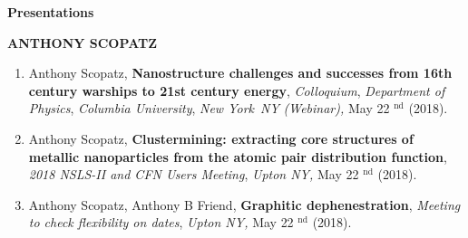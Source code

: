 \documentclass[prl,tighten,amsmath,amssymb,floatfix]{revtex4-1}
\begin{document}
\textbf{Presentations}

\textbf{ANTHONY SCOPATZ}
\vskip 12pt

\begin{enumerate}

\item Anthony Scopatz, {\bf Nanostructure challenges and successes from 16th century warships to 21st century energy},
{\it Colloquium},
{\it Department of Physics},
{\it Columbia University},
{\it New York}\
{\it NY}
{\it (Webinar)}{\it ,} { May }22%
$^\mathrm{ nd }$
(2018).

\item Anthony Scopatz, {\bf Clustermining: extracting core structures of metallic nanoparticles from the atomic pair distribution function},
{\it 2018 NSLS-II and CFN Users Meeting},
{\it Upton NY}{\it ,} { May }22%
$^\mathrm{ nd }$
(2018).

\item Anthony Scopatz, Anthony B Friend, {\bf Graphitic dephenestration},
{\it Meeting to check flexibility on dates},
{\it Upton NY}{\it ,} { May }22%
$^\mathrm{ nd }$
(2018).

\end{enumerate}
\end{document}
